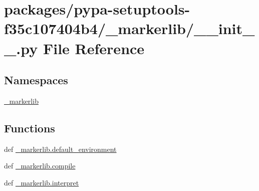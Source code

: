 \hypertarget{packages_2pypa-setuptools-f35c107404b4_2__markerlib_2____init_____8py}{}\section{packages/pypa-\/setuptools-\/f35c107404b4/\+\_\+markerlib/\+\_\+\+\_\+init\+\_\+\+\_\+.py File Reference}
\label{packages_2pypa-setuptools-f35c107404b4_2__markerlib_2____init_____8py}
\subsection*{Namespaces}
\begin{DoxyCompactItemize}
\item 
 \hyperlink{namespace__markerlib}{\+\_\+markerlib}
\end{DoxyCompactItemize}
\subsection*{Functions}
\begin{DoxyCompactItemize}
\item 
def \hyperlink{namespace__markerlib_a3cfc87fe413ffc432783aa4722fd2a27}{\+\_\+markerlib.\+default\+\_\+environment}
\item 
def \hyperlink{namespace__markerlib_a4978e7157781e74bbb591b2fb7a5dfc7}{\+\_\+markerlib.\+compile}
\item 
def \hyperlink{namespace__markerlib_ad4c17a644c52102dfc8ef1ebe0776027}{\+\_\+markerlib.\+interpret}
\end{DoxyCompactItemize}
